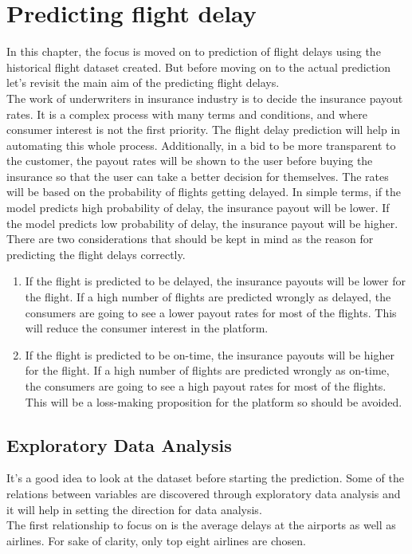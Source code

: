 \chapter{Predicting flight delay}
In this chapter, the focus is moved on to prediction of flight delays using the historical flight dataset created. But before moving on to the actual prediction let's revisit the main aim of the predicting flight delays.
\\The work of underwriters in insurance industry is to decide the insurance payout rates. It is a complex process with many terms and conditions, and where consumer interest is not the first priority. The flight delay prediction will help in automating this whole process. Additionally, in a bid to be more transparent to the customer, the payout rates will be shown to the user before buying the insurance so that the user can take a better decision for themselves. The rates will be based on the probability of flights getting delayed. In simple terms, if the model predicts high probability of delay, the insurance payout will be lower. If the model predicts low probability of delay, the insurance payout will be higher.
\\There are two considerations that should be kept in mind as the reason for predicting the flight delays correctly.
\begin{enumerate}
    \item If the flight is predicted to be delayed, the insurance payouts will be lower for the flight. If a high number of flights are predicted wrongly as delayed, the consumers are going to see a lower payout rates for most of the flights. This will reduce the consumer interest in the platform.
    \item If the flight is predicted to be on-time, the insurance payouts will be higher for the flight. If a high number of flights are predicted wrongly as on-time, the consumers are going to see a high payout rates for most of the flights. This will be a loss-making proposition for the platform so should be avoided.
\end{enumerate}

\section{Exploratory Data Analysis}
It's a good idea to look at the dataset before starting the prediction. Some of the relations between variables are discovered through exploratory data analysis and it will help in setting the direction for data analysis.
\\The first relationship to focus on is the average delays at the airports as well as airlines. For sake of clarity, only top eight airlines are chosen. 

